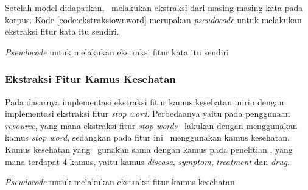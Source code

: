 Setelah model didapatkan, \saya~melakukan ekstraksi dari masing-masing kata pada korpus. Kode \ref{code:ekstraksiownword} merupakan \textit{pseudocode} untuk melakukan ekstraksi fitur kata itu sendiri.

\begin{kode}

	
	\caption{\textit{Pseudocode} untuk melakukan ekstraksi fitur kata itu sendiri}
	\label{code:ekstraksiownword}
\end{kode}

\subsubsection{Ekstraksi Fitur Kamus Kesehatan}
Pada dasarnya implementasi ekstraksi fitur kamus kesehatan mirip dengan implementasi ekstraksi fitur \textit{stop word}. Perbedaanya yaitu pada penggunaan \textit{resource}, yang mana ekstraksi fitur \textit{stop words} \saya~lakukan dengan menggunakan kamus \textit{stop word}, sedangkan pada fitur ini \saya~menggunakan kamus kesehatan. Kamus kesehatan yang \saya~gunakan sama dengan kamus pada penelitian \cite{skripsiKakRadit}, yang mana terdapat 4 kamus, yaitu kamus \textit{disease}, \textit{symptom}, \textit{treatment} dan \textit{drug}.

\begin{kode}
	
	
	\SetAlgoLined
	\BlankLine
	
	
	\caption{\textit{Pseudocode} untuk melakukan ekstraksi fitur kamus kesehatan}
	\label{code:ekstraksikamus}	
\end{kode}

